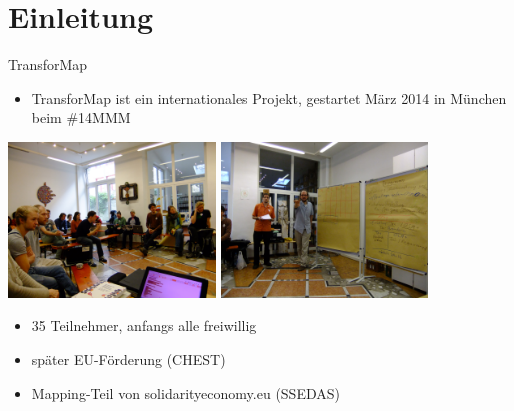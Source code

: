 \documentclass{beamer}
\begin{document}

\section{Einleitung}

\begin{frame}{TransforMap}

\begin{itemize}
  \item TransforMap ist ein internationales Projekt, gestartet März 2014 in München beim \#14MMM
\end{itemize}
 \includegraphics[width=5.5cm]{DSCF9024-gruppe.JPG}
 \includegraphics[width=5.5cm]{DSCF9025-josef+me.jpg}

\pause

\begin{itemize}
  \item 35 Teilnehmer, anfangs alle freiwillig
\pause
  \item später EU-Förderung (CHEST)
  \item Mapping-Teil von solidarityeconomy.eu (SSEDAS)

\end{itemize}

\end{frame}

%
\end{document}
